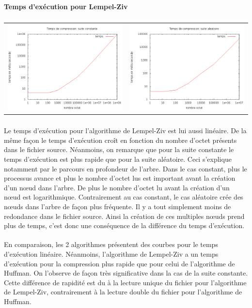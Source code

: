 \documentclass{report}
\begin{document}
\newpage
\paragraph*{}
\textbf{Temps d’exécution pour Lempel-Ziv}
\subparagraph*{}
\hspace{-2cm}\begin{tabular}{l | l}
\includegraphics[width=7cm]{tempsClzC.png} & 
\includegraphics[width=7cm]{tempsClzA.png}
\end{tabular}

\subparagraph*{}
Le temps d'exécution pour l'algorithme de Lempel-Ziv est lui aussi linéaire. De la même façon le temps d'exécution croît en fonction du nombre d'octet présents dans le fichier source. Néanmoins, on remarque que pour la suite constante le temps d'exécution est plus rapide que pour la suite aléatoire. Ceci s'explique notamment par le parcours en profondeur de l'arbre. Dans le cas constant, plus le processus avance et plus le nombre d'octet lus est important avant la création d'un nœud dans l'arbre. De plus le nombre d'octet lu avant la création d'un nœud est logarithmique. Contrairement au cas constant, le cas aléatoire crée des nœuds dans l'arbre de façon plus fréquente. Il y a tout simplement moins de redondance dans le fichier source. Ainsi la création de ces multiples nœuds prend plus de temps, c'est donc une conséquence de la différence du temps d'exécution.

\paragraph*{}
En comparaison, les 2 algorithmes présentent des courbes pour le temps d'exécution linéaire. Néanmoins, l'algorithme de Lempel-Ziv a un temps d'exécution pour la compression plus rapide que pour celui de l'algorithme de Huffman. On l'observe de façon très significative dans la cas de la suite constante. Cette différence de rapidité est du à la lecture unique du fichier pour l'algorithme de Lempel-Ziv, contrairement à la lecture double du fichier pour l'algorithme de Huffman.	
\newpage
\end{document}
